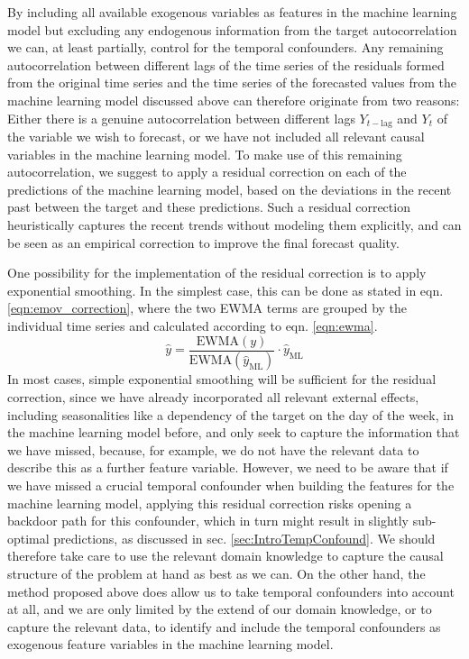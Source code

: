 \documentclass[BCOR=1mm, DIV=calc,10pt,
twoside=true,
twocolumn,
headings=normal]{scrartcl}
\begin{document}
By including all available exogenous variables as features in the machine learning model but excluding any endogenous information from the target autocorrelation we can, at least partially, control for the temporal confounders. Any remaining autocorrelation between different lags of the time series of the residuals formed from the original time series and the time series of the forecasted values from the machine learning model discussed above can therefore originate from two reasons: Either there is a genuine autocorrelation between different lags $Y_{t-\mathrm{lag}}$ and $Y_t$ of the variable we wish to forecast, or we have not included all relevant causal variables in the machine learning model. To make use of this remaining autocorrelation, we suggest to apply a residual correction on each of the predictions of the machine learning model, based on the deviations in the recent past between the target and these predictions. Such a residual correction heuristically captures the recent trends without modeling them explicitly, and can be seen as an empirical correction to improve the final forecast quality.

One possibility for the implementation of the residual correction is to apply exponential smoothing. In the simplest case, this can be done as stated in eqn. \ref{eqn:emov_correction}, where the two EWMA terms are grouped by the individual time series and calculated according to eqn. \ref{eqn:ewma}.
\begin{equation} \label{eqn:emov_correction}
\hat{y} = \frac{\mathrm{EWMA}(y)}{\mathrm{EWMA}(\hat{y}_{\mathrm{ML}})} \cdot \hat{y}_{\mathrm{ML}}
\end{equation}
In most cases, simple exponential smoothing will be sufficient for the residual correction, since we have already incorporated all relevant external effects, including seasonalities like a dependency of the target on the day of the week, in the machine learning model before, and only seek to capture the information that we have missed, because, for example, we do not have the relevant data to describe this as a further feature variable. However, we need to be aware that if we have missed a crucial temporal confounder when building the features for the machine learning model, applying this residual correction risks opening a backdoor path for this confounder, which in turn might result in slightly sub-optimal predictions, as discussed in sec. \ref{sec:IntroTempConfound}. We should therefore take care to use the relevant domain knowledge to capture the causal structure of the problem at hand as best as we can. On the other hand, the method proposed above does allow us to take temporal confounders into account at all, and we are only limited by the extend of our domain knowledge, or to capture the relevant data, to identify and include the temporal confounders as exogenous feature variables in the machine learning model.
\end{document}
